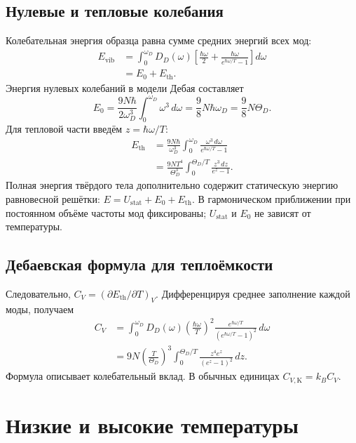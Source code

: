 \documentclass[../final.tex]{subfiles}
\begin{document}
\subsection{Нулевые и тепловые колебания}
Колебательная энергия образца равна сумме средних энергий всех мод:
\begin{align*}
 E_{\mathrm{vib}}&=\int_0^{\omega_D}D_D(\omega)
 \left[\frac{\hbar\omega}{2}
 +\frac{\hbar\omega}{e^{\hbar\omega/T}-1}\right]d\omega\\
 &=E_0+E_{\mathrm{th}}.
\end{align*}
Энергия нулевых колебаний в модели Дебая составляет
\begin{equation*}
 E_0=\frac{9N\hbar}{2\omega_D^3}\int_0^{\omega_D}\omega^3\,d\omega
 =\frac98N\hbar\omega_D=\frac98N\Theta_D.
\end{equation*}
Для тепловой части введём $z=\hbar\omega/T$:
\begin{align*}
 E_{\mathrm{th}}&=\frac{9N\hbar}{\omega_D^3}
 \int_0^{\omega_D}\frac{\omega^3\,d\omega}{e^{\hbar\omega/T}-1}\\
 &=\frac{9NT^4}{\Theta_D^3}
 \int_0^{\Theta_D/T}\frac{z^3\,dz}{e^z-1}.
\end{align*}
Полная энергия твёрдого тела дополнительно содержит статическую энергию
равновесной решётки: $E=U_{\mathrm{stat}}+E_0+E_{\mathrm{th}}$.
В гармоническом приближении при постоянном объёме частоты мод фиксированы;
$U_{\mathrm{stat}}$ и $E_0$ не зависят от температуры.

\subsection{Дебаевская формула для теплоёмкости}
Следовательно, $C_V=(\partial E_{\mathrm{th}}/\partial T)_V$.
Дифференцируя среднее заполнение каждой моды, получаем
\begin{align*}
 C_V&=\int_0^{\omega_D}D_D(\omega)
 \left(\frac{\hbar\omega}{T}\right)^2
 \frac{e^{\hbar\omega/T}}{(e^{\hbar\omega/T}-1)^2}\,d\omega\\
 &=9N\left(\frac{T}{\Theta_D}\right)^3
 \int_0^{\Theta_D/T}\frac{z^4e^z}{(e^z-1)^2}\,dz.
\end{align*}
Формула описывает колебательный вклад. В обычных единицах
$C_{V,\mathrm K}=k_BC_V$.

\clearpage
\section{Низкие и высокие температуры}
\end{document}
